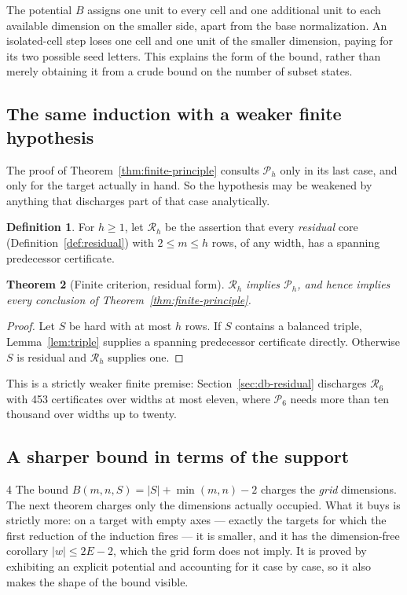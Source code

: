\documentclass[11pt,letterpaper]{article}
\numberwithin{equation}{section}
\newtheorem{theorem}{Theorem}[section]
\theoremstyle{definition}
\newtheorem{definition}[theorem]{Definition}
\theoremstyle{remark}
\begin{document}
The potential $B$ assigns one unit to every cell and one additional unit
to each available dimension on the smaller side, apart from the base
normalization. An isolated-cell step loses one cell and one unit of the
smaller dimension, paying for its two possible seed letters. This explains
the form of the bound, rather than merely obtaining it from a crude bound
on the number of subset states.

\subsection{The same induction with a weaker finite hypothesis}
\label{sec:criterion-residual}
The proof of Theorem~\ref{thm:finite-principle} consults $\mathcal P_h$ only
in its last case, and only for the target actually in hand. So the hypothesis
may be weakened by anything that discharges part of that case analytically.

\begin{definition}
For $h\ge1$, let $\mathcal R_h$ be the assertion that every \emph{residual}
core (Definition~\ref{def:residual}) with $2\le m\le h$ rows, of any width,
has a spanning predecessor certificate.
\end{definition}

\begin{theorem}[Finite criterion, residual form]\label{thm:finite-residual}
$\mathcal R_h$ implies $\mathcal P_h$, and hence implies every conclusion of
Theorem~\ref{thm:finite-principle}.
\end{theorem}
\begin{proof}
Let $S$ be hard with at most $h$ rows. If $S$ contains a balanced triple,
Lemma~\ref{lem:triple} supplies a spanning predecessor certificate directly.
Otherwise $S$ is residual and $\mathcal R_h$ supplies one.
\end{proof}

This is a strictly weaker finite premise: Section~\ref{sec:db-residual}
discharges $\mathcal R_6$ with 453 certificates over widths at most eleven,
where $\mathcal P_6$ needs more than ten thousand over widths up to twenty.

\subsection{A sharper bound in terms of the support}
\label{sec:support-bound}
\begin{variantbox}{4}
The bound $B(m,n,S)=|S|+\min(m,n)-2$ charges the \emph{grid} dimensions. The
next theorem charges only the dimensions actually occupied. What it buys is
strictly more: on a target with empty axes --- exactly the targets for which
the first reduction of the induction fires --- it is smaller, and it has the
dimension-free corollary $|w|\le2E-2$, which the grid form does not imply. It
is proved by exhibiting an explicit potential and accounting for it case by
case, so it also makes the shape of the bound visible.
\end{variantbox}
\end{document}
